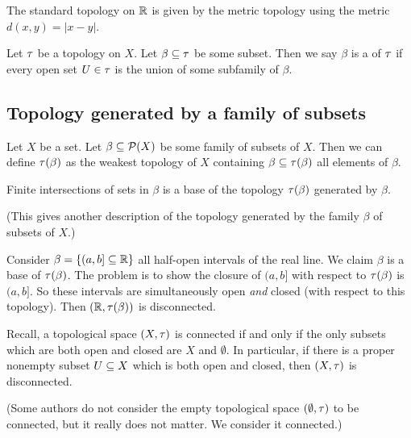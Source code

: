 \begin{node}
The standard topology on $\mathbb{R}$ is given by the metric topology using
the metric $d(x,y)=|x-y|$.
\end{node}

\begin{definition}
Let $\tau$ be a topology on $X$. Let $\beta\subseteq\tau$ be some
subset. Then we say $\beta$ is a  of $\tau$ if every open
set $U\in\tau$ is the union of some subfamily of $\beta$.
\end{definition}

\subsection{Topology generated by a family of subsets}

\begin{definition}
Let $X$ be a set. Let $\beta\subseteq\mathcal{P}(X)$ be some family of
subsets of $X$. Then we can define $\tau(\beta)$ as the weakest
topology of $X$ containing $\beta\subseteq\tau(\beta)$ all elements of $\beta$.
\end{definition}

\begin{theorem}
Finite intersections of sets in $\beta$ is a base of the topology
$\tau(\beta)$ generated by $\beta$.
\end{theorem}
(This gives another description of the topology generated by the
family $\beta$ of subsets of $X$.)

\begin{example}
Consider $\beta=\{(a,b]\subseteq\mathbb{R}\}$ all half-open intervals of the
real line. We claim $\beta$ is a base of $\tau(\beta)$. The problem
is to show the closure of $(a,b]$ with respect to $\tau(\beta)$ is
$(a,b]$. So these intervals are simultaneously open \emph{and}
closed (with respect to this topology).
Then $(\mathbb{R},\tau(\beta))$ is disconnected.
\end{example}

\begin{theorem}
Recall, a topological space $(X,\tau)$ is connected if and only if the
only subsets which are both open and closed are $X$ and
$\emptyset$. In particular, if there is a proper nonempty subset
$U\propersubset X$ which is both open and closed, then $(X,\tau)$ is
disconnected. 
\end{theorem}

(Some authors do not consider the empty topological space
$(\emptyset,\tau)$ to be connected, but it really does not matter. We
consider it connected.)

\endinput